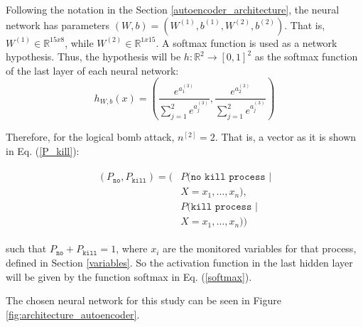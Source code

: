 \documentclass{iosart2c}
\begin{document}
Following the notation in the Section \ref{autoencoder_architecture}, the neural network has parameters $(W,b)=(W^{(1)},b^{(1)},W^{(2)},b^{(2)})$. That is, $W^{(1)} \in \mathbb {R}^{15x8}$, while $ W^{(2)} \in \mathbb {R}^{1x15}$. A softmax function is used as a network hypothesis. Thus, the hypothesis will be $h: \mathbb {R}^ {2} \rightarrow [0,1]^2 $ as the softmax function of the last layer of each neural network: 
\begin{equation}\label{softmax}
h_{W,b}(x)=\left(\frac{e^{a_1^{(3)}}}{\sum_{j=1}^2 e^{a_j^{(3)}}},\frac{e^{a_2^{(3)}}}{\sum_{j=1}^2 e^{a_j^{(3)}}}\right)
\end{equation}


Therefore, for the logical bomb attack, $n^{[2]}=2$. That is, a vector as it is shown in Eq. (\ref{P_kill}):


\begin{eqnarray}
\begin{aligned}\label{P_kill}
    (P_{\texttt{no}},P_{\texttt{kill}})=(&P(\texttt{no kill process } | \\
									    & X=x_1,\ldots,x_n),\\
                                         &P(\texttt{kill process } | \\
                                         & X=x_1,\ldots,x_n))
\end{aligned}
\end{eqnarray}

such that  $P_{\texttt{no}}+P_{\texttt{kill}}=1$, where $x_i$ are the monitored variables for that process, defined in Section \ref{variables}. So the activation function in the last hidden layer will be given by the function softmax in Eq. (\ref{softmax}).

The chosen neural network for this study can be seen in Figure \ref{fig:architecture_autoencoder}.
\end{document}
